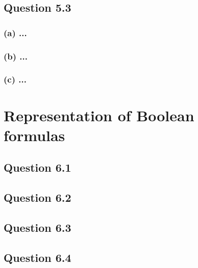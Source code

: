 \documentclass[10pt,a4paper]{article}
\begin{document}
\subsection*{Question 5.3}
\subsubsection*{(a) \mdseries ...}
\subsubsection*{(b) \mdseries ...}
\subsubsection*{(c) \mdseries ...}

\section{Representation of Boolean formulas}
\subsection*{Question 6.1}
\subsection*{Question 6.2}
\subsection*{Question 6.3}
\subsection*{Question 6.4}
\end{document}

